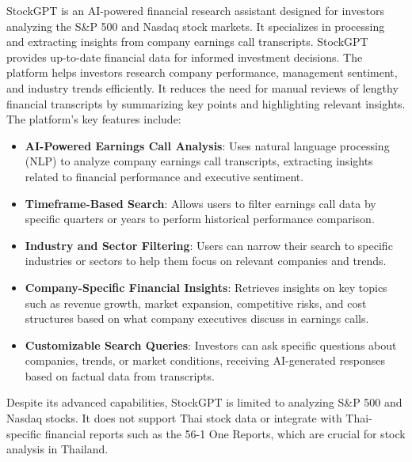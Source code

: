 \FloatBarrier

StockGPT is an AI-powered financial research assistant designed for investors analyzing the S\&P 500 and Nasdaq stock markets. 
It specializes in processing and extracting insights from company earnings call transcripts. StockGPT provides up-to-date financial data for informed investment decisions. 
The platform helps investors research company performance, management sentiment, and industry trends efficiently. It reduces the need for manual reviews of lengthy financial 
transcripts by summarizing key points and highlighting relevant insights. The platform's key features include:

\begin{itemize}[leftmargin=60pt]
    \item \textbf{AI-Powered Earnings Call Analysis}: Uses natural language processing (NLP) to analyze company earnings call transcripts, extracting insights related to financial performance and executive sentiment.
    \item \textbf{Timeframe-Based Search}: Allows users to filter earnings call data by specific quarters or years to perform historical performance comparison.
    \item \textbf{Industry and Sector Filtering}: Users can narrow their search to specific industries or sectors to help them focus on relevant companies and trends.
    \item \textbf{Company-Specific Financial Insights}: Retrieves insights on key topics such as revenue growth, market expansion, competitive risks, and cost structures based on what company executives discuss in earnings calls.
    \item \textbf{Customizable Search Queries}: Investors can ask specific questions about companies, trends, or market conditions, receiving AI-generated responses based on factual data from transcripts.
\end{itemize}

Despite its advanced capabilities, StockGPT is limited to analyzing S\&P 500 and Nasdaq stocks. It does not support Thai stock data or integrate with Thai-specific financial reports such as 
the 56-1 One Reports, which are crucial for stock analysis in Thailand\cite{StockGPTWebsite}.

